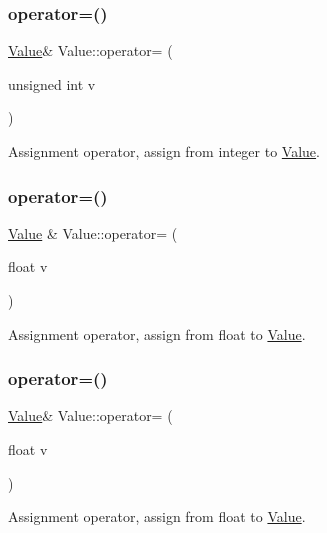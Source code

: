 \subsubsection{\texorpdfstring{operator=()}{operator=()}\hspace{0.1cm}{\footnotesize\ttfamily [10/32]}}
{\footnotesize\ttfamily \hyperlink{classValue}{Value}\& Value\+::operator= (\begin{DoxyParamCaption}\item[{unsigned int}]{v }\end{DoxyParamCaption})}

Assignment operator, assign from integer to \hyperlink{classValue}{Value}. \mbox{\label{classValue_a6213233683312cb0279d341bc8d1b926}} 
\subsubsection{\texorpdfstring{operator=()}{operator=()}\hspace{0.1cm}{\footnotesize\ttfamily [11/32]}}
{\footnotesize\ttfamily \hyperlink{classValue}{Value} \& Value\+::operator= (\begin{DoxyParamCaption}\item[{float}]{v }\end{DoxyParamCaption})}

Assignment operator, assign from float to \hyperlink{classValue}{Value}. \mbox{\label{classValue_a876b27089d5d8813defe9a579ebe3a69}} 
\subsubsection{\texorpdfstring{operator=()}{operator=()}\hspace{0.1cm}{\footnotesize\ttfamily [12/32]}}
{\footnotesize\ttfamily \hyperlink{classValue}{Value}\& Value\+::operator= (\begin{DoxyParamCaption}\item[{float}]{v }\end{DoxyParamCaption})}

Assignment operator, assign from float to \hyperlink{classValue}{Value}. \mbox{\label{classValue_a26c98fc44012d2b87ab03c4c6054358c}} 
